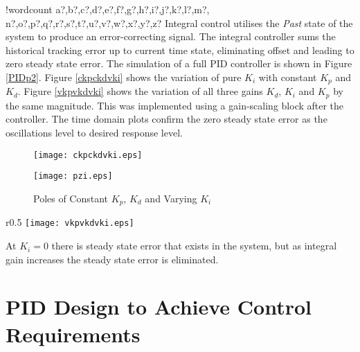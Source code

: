 \documentclass[11pt]{article}
\newcounter{words}
\newenvironment{counted}{%
  \setcounter{words}{0}
  \SearchList!{wordcount}{\stepcounter{words}}
    {a?,b?,c?,d?,e?,f?,g?,h?,i?,j?,k?,l?,m?,
    n?,o?,p?,q?,r?,s?,t?,u?,v?,w?,x?,y?,z?}
  \UndoBoundary{'}
  \SearchOrder{p;}}{%
  \StopSearching}
\begin{document}
\begin{counted}
Integral control utilises the \emph{Past} state of the system to produce
an error-correcting signal. The integral controller sums the historical
tracking error up to current time state, eliminating offset and leading
to zero steady state error. The simulation of a full PID controller is
shown in Figure \ref{PIDp2}. Figure \ref{ckpckdvki} shows the variation
of pure \(K_i\) with constant \(K_p\) and \(K_d\). Figure
\ref{vkpvkdvki} shows the variation of all three gains \(K_d\), \(K_i\)
and \(K_p\) by the same magnitude. This was implemented using a
gain-scaling block after the controller. The time domain plots confirm
the zero steady state error as the oscillations level to desired
response level.

\begin{figure}[h]
\centering
\begin{minipage}{.455\textwidth}
 \centering
 \texttt{[image: ckpckdvki.eps]}
 \caption{Time-Domain Response For Constant $K_p$, $K_d$ and Varying $K_i$}
 \label{ckpckdvki}
\end{minipage}
\hfill
\begin{minipage}{.455\textwidth}
\centering
\texttt{[image: pzi.eps]}
\caption{Poles of Constant $K_p$, $K_d$ and Varying $K_i$}
\label{pzi}
\end{minipage}
\vspace{-20pt}
\end{figure}

\begin{wrapfigure}{r}{0.5\textwidth}
\centering
\vspace{-5pt} %
\texttt{[image: vkpvkdvki.eps]}
\vspace{-10pt}
\caption{Time-Domain Response For Varying $K_p$, $K_d$ and $K_i$}
  \label{vkpvkdvki}
\vspace{-35pt}
\end{wrapfigure}

At \(K_i = 0\) there is steady state error that exists in the system,
but as integral gain increases the steady state error is eliminated.

\section{PID Design to Achieve Control
Requirements}\label{pid-design-to-achieve-control-requirements}


\end{counted}
\end{document}
